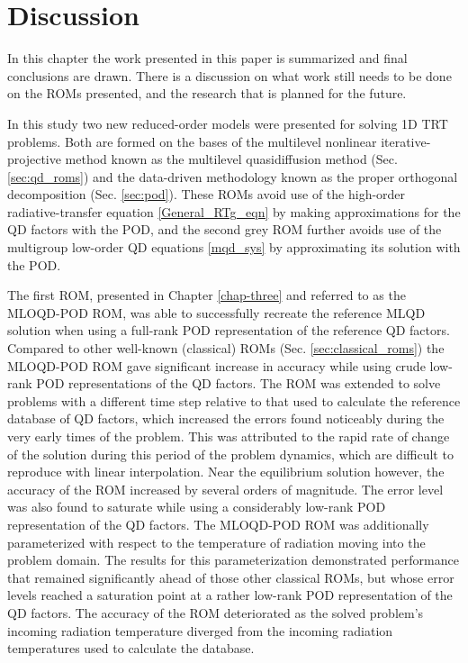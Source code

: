 \chapter{Discussion}
\label{chap-five}

In this chapter the work presented in this paper is summarized and final conclusions are drawn. There is a discussion on what work still needs to be done on the ROMs presented, and the research that is planned for the future.

\ind In this study two new reduced-order models were presented for solving 1D TRT problems. Both are formed on the bases of the multilevel nonlinear iterative-projective method known as the multilevel quasidiffusion method (Sec. \ref{sec:qd_roms}) and the data-driven methodology known as the proper orthogonal decomposition (Sec. \ref{sec:pod}). These ROMs avoid use of the high-order radiative-transfer equation \eqref{General_RTg_eqn} by making approximations for the QD factors with the POD, and the second grey ROM further avoids use of the multigroup low-order QD equations \eqref{mqd_sys} by approximating its solution with the POD. 

\ind The first ROM, presented in Chapter \ref{chap-three} and referred to as the MLOQD-POD ROM, was able to successfully recreate the reference MLQD solution when using a full-rank POD representation of the reference QD factors. Compared to other well-known (classical) ROMs (Sec. \ref{sec:classical_roms}) the MLOQD-POD ROM gave significant increase in accuracy while using crude low-rank POD representations of the QD factors. The ROM was extended to solve problems with a different time step relative to that used to calculate the reference database of QD factors, which increased the errors found noticeably during the very early times of the problem. This was attributed to the rapid rate of change of the solution during this period of the problem dynamics, which are difficult to reproduce with linear interpolation. Near the equilibrium solution however, the accuracy of the ROM increased by several orders of magnitude. The error level was also found to saturate while using a considerably low-rank POD representation of the QD factors. The MLOQD-POD ROM was additionally parameterized with respect to the temperature of radiation moving into the problem domain. The results for this parameterization demonstrated performance that remained significantly ahead of those other classical ROMs, but whose error levels reached a saturation point at a rather low-rank POD representation of the QD factors. The accuracy of the ROM deteriorated as the solved problem's incoming radiation temperature diverged from the incoming radiation temperatures used to calculate the database.

